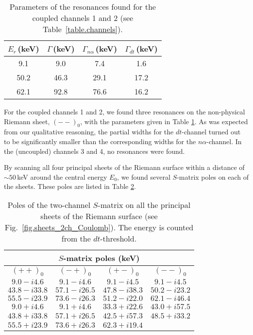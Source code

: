 \documentclass[12pt]{article}
\begin{document}
\begin{table}
\begin{center}
\begin{tabular}{|c|c|c|c|}
\hline
$E_r$\,(keV) & $\Gamma$\,(keV) & $\Gamma_{n\alpha}$\,(keV) &
$\Gamma_{dt}$\,(keV)\\
\hline
9.1 & 9.0 & 7.4 & 1.6\\
\hline
50.2 & 46.3 & 29.1 & 17.2\\
\hline
62.1 & 92.8 & 76.6 & 16.2\\
\hline
\end{tabular}
\end{center}
\caption{\sf
Parameters of the resonances found for the coupled channels 1 and 2 (see
Table~\ref{table.channels}).
}
\label{table.resonances}
\end{table}

For the coupled channels 1 and 2, we found three resonances on the
non-physical Riemann sheet, $(--)_0$, with the parameters given in Table
\ref{table.resonances}.
As was expected from our qualitative reasoning, the partial widths for the
$dt$-channel turned out to be significantly smaller than the corresponding
widths for the $n\alpha$-channel. In the (uncoupled) channels 3 and 4, no
resonances were found.

By scanning all four principal sheets of the Riemann surface within a distance
of $\sim50$\,keV around the central energy $E_0$, we found several $S$-matrix
poles on each of the sheets. These poles are listed in
Table \ref{table.allpoles}.

\begin{table}
\begin{center}
\begin{tabular}{|c|c|c|c|}
\hline
\multicolumn{4}{|c|}{\sffamily $S$-matrix poles (keV)}\\
\hline
$(++)_0$ & $(-+)_0$ & $(+-)_0$ & $(--)_0$ \\
\hline
$9.0-i4.6$   & $9.1-i4.6$   & $9.1-i4.5$   & $9.1-i4.5$ \\
$43.8-i33.8$ & $57.1-i26.5$ & $47.8-i38.3$ & $50.2-i23.2$ \\
$55.5-i23.9$ & $73.6-i26.3$ & $51.2-i22.0$ & $62.1-i46.4$ \\
\hline
$9.0+i4.6$   & $9.1+i4.6$   & $33.3+i22.6$ & $43.0+i57.5$ \\
$43.8+i33.8$ & $57.1+i26.5$ & $42.5+i57.3$ & $48.5+i33.2$ \\
$55.5+i23.9$ & $73.6+i26.3$ & $62.3+i19.4$ & \\
\hline
\end{tabular}
\end{center}
\caption{\sf
Poles of the two-channel $S$-matrix on all the principal sheets of the Riemann
surface (see Fig.~\ref{fig.sheets_2ch_Coulomb}).
The energy is counted from the $dt$-threshold.
}
\label{table.allpoles}
\end{table}
\end{document}
